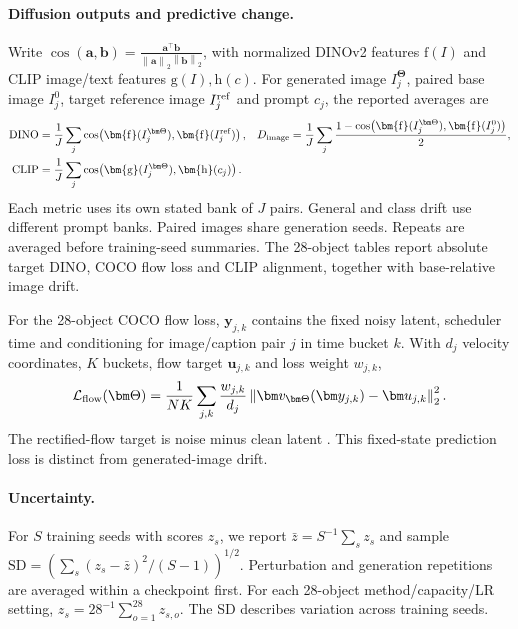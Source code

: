 \paragraph{Diffusion outputs and predictive change.}
Write $\cos(\bm a,\bm b)=\frac{\bm a^{\!\top}\bm b}{\left\|\bm a\right\|_2\left\|\bm b\right\|_2}$, with normalized DINOv2 features $\bm{\mathrm{f}}(I)$ and CLIP image/text features $\bm{\mathrm{g}}(I),\bm{\mathrm{h}}(c)$. For generated image $I_j^{\bm\Theta}$, paired base image $I_j^0$, target reference image $I_j^{\rm ref}$ and prompt $c_j$, the reported averages are
\begin{align*}
 \mathrm{DINO}&=\frac{1}{J}\sum_j\cos\!\left(\bm{\mathrm{f}}(I_j^{\bm\Theta}),\bm{\mathrm{f}}(I_j^{\rm ref})\right),
 &D_{\rm image}&=\frac{1}{J}\sum_j\frac{1-\cos\!\left(\bm{\mathrm{f}}(I_j^{\bm\Theta}),\bm{\mathrm{f}}(I_j^0)\right)}{2},\\
 \mathrm{CLIP}&=\frac{1}{J}\sum_j\cos\!\left(\bm{\mathrm{g}}(I_j^{\bm\Theta}),\bm{\mathrm{h}}(c_j)\right).
\end{align*}
Each metric uses its own stated bank of $J$ pairs. General and class drift use different prompt banks. Paired images share generation seeds. Repeats are averaged before training-seed summaries. The 28-object tables report absolute target DINO, COCO flow loss and CLIP alignment, together with base-relative image drift.

For the 28-object COCO flow loss, $\bm y_{j,k}$ contains the fixed noisy latent, scheduler time and conditioning for image/caption pair $j$ in time bucket $k$. With $d_j$ velocity coordinates, $K$ buckets, flow target $\bm u_{j,k}$ and loss weight $w_{j,k}$,
\begin{equation*}
 \mathcal L_{\rm flow}(\bm\Theta)=\frac{1}{NK}\sum_{j,k}\frac{w_{j,k}}{d_j}
 \left\|\bm v_{\bm\Theta}(\bm y_{j,k})-\bm u_{j,k}\right\|_2^2.
\end{equation*}
The rectified-flow target is noise minus clean latent \citep{liu2023rectifiedflow}. This fixed-state prediction loss is distinct from generated-image drift.

\paragraph{Uncertainty.}
For $S$ training seeds with scores $z_s$, we report $\bar z=S^{-1}\sum_s z_s$ and sample $\mathrm{SD}=\left(\sum_s(z_s-\bar z)^2/(S-1)\right)^{1/2}$. Perturbation and generation repetitions are averaged within a checkpoint first. For each 28-object method/capacity/LR setting, $z_s=28^{-1}\sum_{o=1}^{28}z_{s,o}$. The SD describes variation across training seeds.
